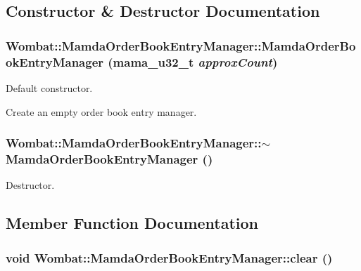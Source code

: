 \subsection{Constructor \& Destructor Documentation}
\hypertarget{classWombat_1_1MamdaOrderBookEntryManager_5d742804d0e37c45f5b3ccd710726823}{
\subsubsection[MamdaOrderBookEntryManager]{\setlength{\rightskip}{0pt plus 5cm}Wombat::Mamda\-Order\-Book\-Entry\-Manager::Mamda\-Order\-Book\-Entry\-Manager (mama\_\-u32\_\-t {\em approx\-Count})}}
\label{classWombat_1_1MamdaOrderBookEntryManager_5d742804d0e37c45f5b3ccd710726823}


Default constructor. 

Create an empty order book entry manager. \hypertarget{classWombat_1_1MamdaOrderBookEntryManager_7716971985e070a4542bdb0258a7a26f}{
\subsubsection[$\sim$MamdaOrderBookEntryManager]{\setlength{\rightskip}{0pt plus 5cm}Wombat::Mamda\-Order\-Book\-Entry\-Manager::$\sim$Mamda\-Order\-Book\-Entry\-Manager ()}}
\label{classWombat_1_1MamdaOrderBookEntryManager_7716971985e070a4542bdb0258a7a26f}


Destructor. 



\subsection{Member Function Documentation}
\hypertarget{classWombat_1_1MamdaOrderBookEntryManager_04f7889c0dc6c0526e2ba60822d80497}{
\subsubsection[clear]{\setlength{\rightskip}{0pt plus 5cm}void Wombat::Mamda\-Order\-Book\-Entry\-Manager::clear ()}}
\label{classWombat_1_1MamdaOrderBookEntryManager_04f7889c0dc6c0526e2ba60822d80497}


